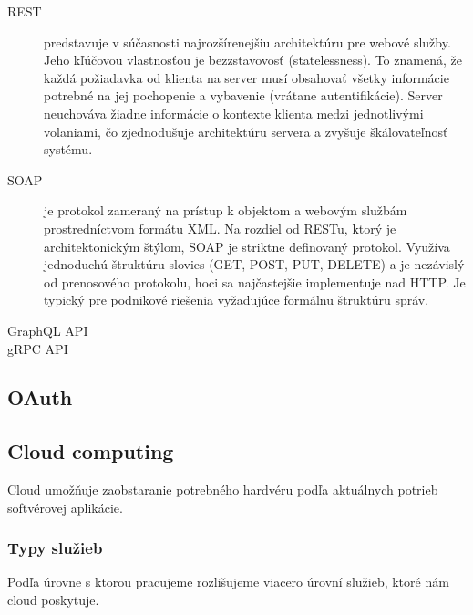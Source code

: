 \begin{description}
    \item[REST] predstavuje v súčasnosti najrozšírenejšiu architektúru pre webové služby. Jeho kľúčovou vlastnosťou je bezzstavovosť (statelessness). To znamená, že každá požiadavka od klienta na server musí obsahovať všetky informácie potrebné na jej pochopenie a vybavenie (vrátane autentifikácie). Server neuchováva žiadne informácie o kontexte klienta medzi jednotlivými volaniami, čo zjednodušuje architektúru servera a zvyšuje škálovateľnosť systému.
    
    \item[SOAP] je protokol zameraný na prístup k objektom a webovým službám prostredníctvom formátu XML. Na rozdiel od RESTu, ktorý je architektonickým štýlom, SOAP je striktne definovaný protokol. Využíva jednoduchú štruktúru slovies (GET, POST, PUT, DELETE) a je nezávislý od prenosového protokolu, hoci sa najčastejšie implementuje nad HTTP. Je typický pre podnikové riešenia vyžadujúce formálnu štruktúru správ.
    
    \item[GraphQL API]
    
    \item[gRPC API]
\end{description}

\subsection{OAuth}

\subsection{Cloud computing}
Cloud umožňuje zaobstaranie potrebného hardvéru podľa aktuálnych potrieb softvérovej aplikácie.

\subsubsection{Typy služieb}
Podľa úrovne s ktorou pracujeme rozlišujeme viacero úrovní služieb, ktoré nám cloud poskytuje.

